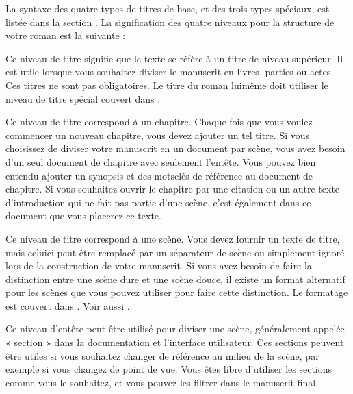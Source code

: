 \documentclass[a4paper,11pt,french]{sphinxmanual}
\begin{document}
\sphinxAtStartPar
La syntaxe des quatre types de titres de base, et des trois types spéciaux, est listée dans la section {\hyperref[\detokenize{usage_format:a-fmt-head}]{}}. La signification des quatre niveaux pour la structure de votre roman est la suivante :
\begin{description}
\sphinxAtStartPar
Ce niveau de titre signifie que le texte se réfère à un titre de niveau supérieur. Il est utile lorsque vous souhaitez diviser le manuscrit en livres, parties ou actes. Ces titres ne sont pas obligatoires. Le titre du roman lui\sphinxhyphen{}même doit utiliser le niveau de titre spécial \sphinxcode{\sphinxupquote{\#!}} couvert dans {\hyperref[\detokenize{usage_format:a-fmt-head}]{}}.

\sphinxAtStartPar
Ce niveau de titre correspond à un chapitre. Chaque fois que vous voulez commencer un nouveau chapitre, vous devez ajouter un tel titre. Si vous choisissez de diviser votre manuscrit en un document par scène, vous avez besoin d’un seul document de chapitre avec seulement l’en\sphinxhyphen{}tête. Vous pouvez bien entendu ajouter un synopsis et des mots\sphinxhyphen{}clés de référence au document de chapitre. Si vous souhaitez ouvrir le chapitre par une citation ou un autre texte d’introduction qui ne fait pas partie d’une scène, c’est également dans ce document que vous placerez ce texte.

\sphinxAtStartPar
Ce niveau de titre correspond à une scène. Vous devez fournir un texte de titre, mais celui\sphinxhyphen{}ci peut être remplacé par un séparateur de scène ou simplement ignoré lors de la construction de votre manuscrit. Si vous avez besoin de faire la distinction entre une scène dure et une scène douce, il existe un format alternatif pour les scènes que vous pouvez utiliser pour faire cette distinction. Le formatage est couvert dans {\hyperref[\detokenize{usage_format:a-fmt-head}]{}}. Voir aussi {\hyperref[\detokenize{project_structure:a-struct-heads-scenes}]{}}.

\sphinxAtStartPar
Ce niveau d’en\sphinxhyphen{}tête peut être utilisé pour diviser une scène, généralement appelée « section » dans la documentation et l’interface utilisateur. Ces sections peuvent être utiles si vous souhaitez changer de référence au milieu de la scène, par exemple si vous changez de point de vue. Vous êtes libre d’utiliser les sections comme vous le souhaitez, et vous pouvez les filtrer dans le manuscrit final.

\end{description}
\end{document}
